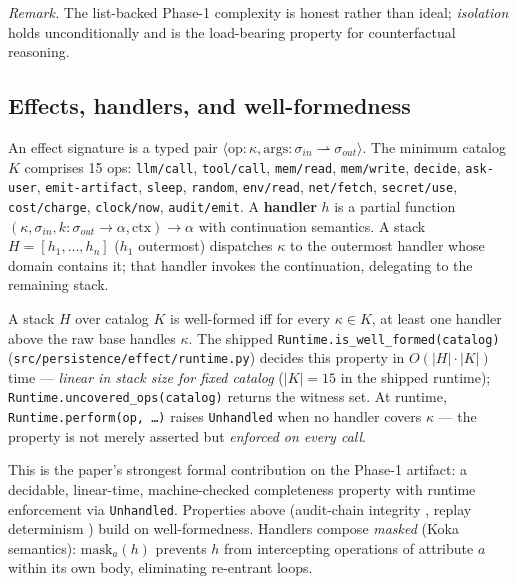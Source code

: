 \documentclass[anon]{nesy2026}   %
\newcommand{\C}[1]{\texttt{#1}}
\begin{document}
\emph{Remark.} The list-backed Phase-1 complexity is honest rather than ideal; \emph{isolation} holds unconditionally and is the load-bearing property for counterfactual reasoning.

\subsection{Effects, handlers, and well-formedness}\label{sec:effects}

An effect signature is a typed pair $\langle \text{op}: \kappa, \text{args}: \sigma_{in} \rightharpoonup \sigma_{out} \rangle$. The minimum catalog $K$ comprises 15 ops: \C{llm/call}, \C{tool/call}, \C{mem/read}, \C{mem/write}, \C{decide}, \C{ask-user}, \C{emit-artifact}, \C{sleep}, \C{random}, \C{env/read}, \C{net/fetch}, \C{secret/use}, \C{cost/charge}, \C{clock/now}, \C{audit/emit}. A \textbf{handler} $h$ is a partial function $(\kappa, \sigma_{in}, k: \sigma_{out} \to \alpha, \mathrm{ctx}) \to \alpha$ with continuation semantics. A stack $H = [h_1, \dots, h_n]$ ($h_1$ outermost) dispatches $\kappa$ to the outermost handler whose domain contains it; that handler invokes the continuation, delegating to the remaining stack.

\begin{proposition}\label{prop:wellformed}
A stack $H$ over catalog $K$ is well-formed iff for every $\kappa \in K$, at least one handler above the raw base handles $\kappa$. The shipped \C{Runtime.is\_well\_formed(catalog)} (\C{src/persistence/effect/runtime.py}) decides this property in $O(|H| \cdot |K|)$ time --- \emph{linear in stack size for fixed catalog} ($|K|=15$ in the shipped runtime); \C{Runtime.uncovered\_ops(catalog)} returns the witness set. At runtime, \C{Runtime.perform(op, \dots)} raises \C{Unhandled} when no handler covers $\kappa$ --- the property is not merely asserted but \emph{enforced on every call}.
\end{proposition}

This is the paper's strongest formal contribution on the Phase-1 artifact: a decidable, linear-time, machine-checked completeness property with runtime enforcement via \C{Unhandled}. Properties above (audit-chain integrity , replay determinism ) build on well-formedness. Handlers compose \emph{masked} (Koka semantics): $\text{mask}_a(h)$ prevents $h$ from intercepting operations of attribute $a$ within its own body, eliminating re-entrant loops.
\end{document}
